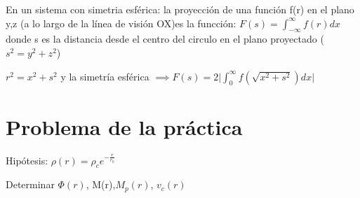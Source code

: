\documentclass[12pt]{book}
\begin{document}
\begin{description}
\item En un sistema con simetria esférica: la proyección de una función f(r) en el plano y,z (a lo largo de la línea de visión OX)es la funcción: 
$F(s) = \int_{-\infty}^\infty{f(r)dx}$ donde s es la distancia desde el centro del circulo en el plano proyectado ($s^2 = y^2 + z^2$)
\item $r^2 = x^2 + s^2$ y la simetría esférica $ \implies  F(s) =  2\lvert \int_0^\infty{f(\sqrt{x^2+s^2})dx} \rvert  $

\end{description}

\section*{Problema de la práctica}
\begin{description}
\item Hipótesis: $\rho(r) = \rho_c e^{-\frac{r}{r_0}} $
\item Determinar $\Phi(r)$, M(r),$M_p(r)$, $v_c(r)$ 

\end{description}
\end{document}
